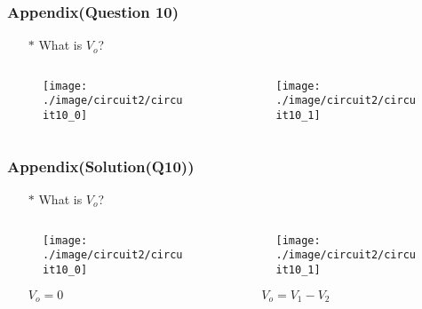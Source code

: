 \documentclass{beamer}
\begin{document}
\begin{frame}
\frametitle{Appendix(Question 10)}
\begin{itemize} \itemsep1pt \parskip0pt 
  \item[$\ast$] What is $V_o$?
\end{itemize}

\begin{columns}
\begin{column}{6cm}

\begin{figure}[H]
  \centering
  \texttt{[image: ./image/circuit2/circuit10\_0]}
\end{figure}

\end{column}


\begin{column}{6cm}

\begin{figure}[H]
  \centering
  \texttt{[image: ./image/circuit2/circuit10\_1]}
\end{figure}

\end{column}
\end{columns}
\end{frame}

\begin{frame}
\frametitle{Appendix(Solution(Q10))}
\begin{itemize} \itemsep1pt \parskip0pt 
  \item[$\ast$] What is $V_o$?
\end{itemize}

\begin{columns}
\begin{column}{6cm}

\begin{figure}[H]
  \centering
  \texttt{[image: ./image/circuit2/circuit10\_0]}
\end{figure}
\begin{itemize} \itemsep1pt \parskip0pt 
  \item[] \centerline{$V_o = 0$}
\end{itemize}
\end{column}


\begin{column}{6cm}

\begin{figure}[H]
  \centering
  \texttt{[image: ./image/circuit2/circuit10\_1]}
\end{figure}
\begin{itemize} \itemsep1pt \parskip0pt 
  \item[] \centerline{$V_o = V_1 - V_2$}
\end{itemize}
\end{column}
\end{columns}
\end{frame}
\end{document}
